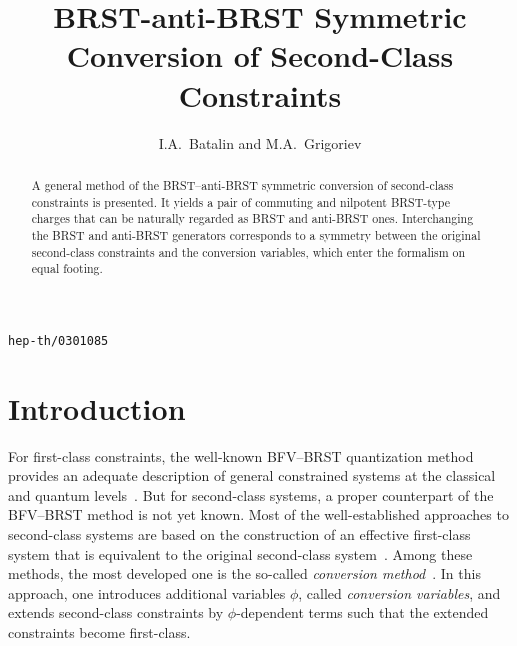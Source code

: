\documentclass[a4paper,12pt]{amsart}
\numberwithin{equation}{section}
\begin{document}
\addtolength{\baselineskip}{2.2pt}

{\hfill{\lowercase{\tt hep-th/0301085}}\\[12pt]}

\title{BRST-anti-BRST Symmetric Conversion of Second-Class Constraints}

\author{I.A.~Batalin and M.A.~Grigoriev} \address{Lebedev Physics
  Institute, RAS, Leninskiy 53, Moscow 117924, Russia}


\begin{abstract}
  A general method of the BRST--anti-BRST symmetric conversion of
  second-class constraints is presented.  It yields a pair of
  commuting and nilpotent BRST-type charges that can be naturally
  regarded as BRST and anti-BRST ones.  Interchanging the BRST and
  anti-BRST generators corresponds to a symmetry between the original
  second-class constraints and the conversion variables, which
  enter the formalism on equal footing.
\end{abstract}
\maketitle







\vspace{0.7cm}

\thispagestyle{empty}

\section{Introduction}
For first-class constraints, the well-known BFV--BRST quantization
method provides an adequate description of general constrained systems
at the classical and quantum levels~\cite{BFV}.  But for second-class
systems, a proper counterpart of the BFV--BRST method is not yet
known.  Most of the well-established approaches to second-class
systems are based on the construction of an effective first-class
system that is equivalent to the original second-class
system~\cite{FSh,BF,BF87, Split,BMgauge}.  Among these methods, the
most developed one is the so-called \textit{conversion
  method}~\cite{FSh,BF,BF87,BT,BGL}.  In this approach, one introduces
additional variables $\phi$, called \textit{conversion variables}, and
extends second-class constraints by $\phi$-dependent terms such that
the extended constraints become first-class.
\end{document}
